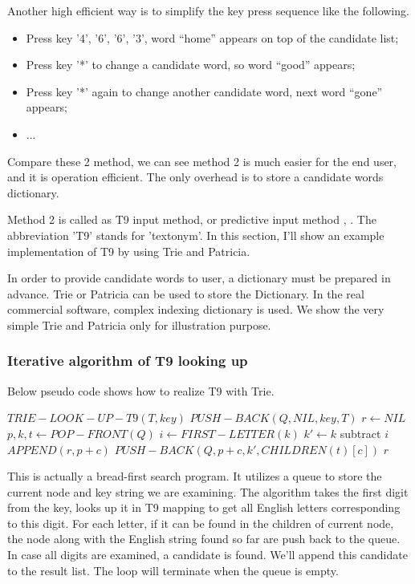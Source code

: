 \documentclass{article}
\begin{document}
Another high efficient way is to simplify the key press sequence like the
following.

\begin{itemize}
\item Press key '4', '6', '6', '3', word ``home'' appears on top of the candidate list;
\item Press key '*' to change a candidate word, so word ``good'' appears;
\item Press key '*' again to change another candidate word, next word ``gone'' appears;
\item ...
\end{itemize}

Compare these 2 method, we can see method 2 is much easier for the end user, and
it is operation efficient. The only overhead is to store a candidate words dictionary.

Method 2 is called as T9 input method, or predictive input method
\cite{wiki-t9}, \cite {wiki-predictive-text}. The abbreviation 'T9' stands
for 'textonym'. In this section, I'll show an example implementation of T9
by using Trie and Patricia.

In order to provide candidate words to user, a dictionary must be prepared
in advance. Trie or Patricia can be used to store the Dictionary. In the real
commercial software, complex indexing dictionary is used. We show the very 
simple Trie and Patricia only for illustration purpose.

\subsubsection{Iterative algorithm of T9 looking up}

Below pseudo code shows how to realize T9 with Trie.

\begin{algorithmic}
\STATE $TRIE-LOOK-UP-T9(T, key)$
  \STATE $PUSH-BACK(Q, NIL, key, T)$
  \STATE $r \leftarrow NIL$
    \STATE $p, k, t \leftarrow POP-FRONT(Q)$
    \STATE $i \leftarrow FIRST-LETTER(k)$
        \STATE $k' \leftarrow k$ subtract $i$
          \STATE $APPEND(r, p+c)$
        \ELSE
          \STATE $PUSH-BACK(Q, p+c, k', CHILDREN(t)[c])$
        \ENDIF
      \ENDIF
    \ENDFOR
  \ENDWHILE
  \RETURN $r$
\end{algorithmic}

This is actually a bread-first search program. It utilizes a queue to store
the current node and key string we are examining. The algorithm takes the first
digit from the key, looks up it in T9 mapping to get all English letters 
corresponding to this digit. For each letter, if it can be found in the children
of current node, the node along with the English string found so far are
push back to the queue. In case all digits are examined, a candidate is found.
We'll append this candidate to the result list. The loop will terminate when
the queue is empty.
\end{document}

